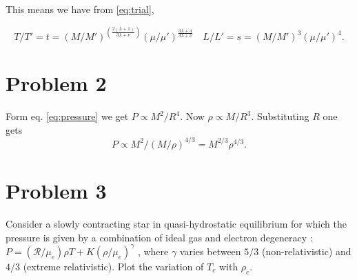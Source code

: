\documentclass{revtex4-2}
\begin{document}
This means we have from \eqref{eq:trial},

\begin{equation}
  \label{eq:temperature-luminosity}
  \boxed{T/T' = t = (M/M')^{\left(\frac{2(\lambda + 1)}{3\lambda + \nu} \right)}(\mu/\mu')^{\frac{3 \lambda +4}{3 \lambda +\nu }}}\quad \boxed{L/L' = s = (M/M')^3 (\mu/\mu')^4}.
\end{equation}

\section*{Problem 2}
\label{sec:problem-2}
Form eq. \eqref{eq:pressure} we get $P \propto M^2/R^4$. Now $\rho \propto M/R^3$. Substituting $R$ one gets
\begin{equation}
  \label{eq:pressure-density}
  P \propto M^2 / (M/\rho)^{4/3} = M^{2/3}\rho^{4/3}.
\end{equation}

\section*{Problem 3}
\label{sec:problem-3}
Consider a slowly contracting star in quasi-hydrostatic equilibrium for which the pressure is given by a combination of ideal gas and electron degeneracy : $P = (\mathcal{R}/\mu_e)\rho T + K(\rho/\mu_e )^\gamma$ , where $\gamma$ varies between $5/3$ (non-relativistic) and $4/3$ (extreme relativistic). Plot the variation of $T_c$ with $\rho_c$.\\
\end{document}
